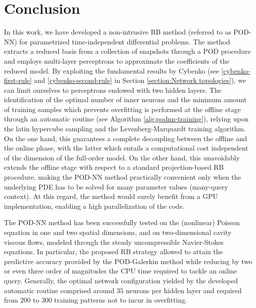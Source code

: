 \documentclass[12pt, a4paper, twoside, openright, notitlepage]{report}
\numberwithin{equation}{chapter}
\theoremstyle{theorem}
\theoremstyle{definition}
\theoremstyle{remark}
\theoremstyle{proposition}
\numberwithin{figure}{chapter}
\begin{document}
		
	\chapter*{Conclusion}
	
		In this work, we have developed a non-intrusive RB method (referred to as POD-NN) for parametrized time-independent differential problems. The method extracts a reduced basis from a collection of snapshots through a POD procedure and employs multi-layer perceptrons to approximate the coefficients of the reduced model. By exploiting the fundamental results by Cybenko (see \ref{cybenko-first-rule} and \ref{cybenko-second-rule} in Section \ref{section:Network topologies}), we can limit ourselves to perceptrons endowed with two hidden layers. The identification of the optimal number of inner neurons and the minimum amount of training samples which prevents overfitting is performed at the offline stage through an automatic routine (see Algorithm \ref{alg:podnn-training}), relying upon the latin hypercube sampling and the Levenberg-Marquardt training algorithm. On the one hand, this guarantees a complete decoupling between the offline and the online phase, with the latter which entails a computational cost independent of the dimension of the full-order model. On the other hand, this unavoidably extends the offline stage with respect to a standard projection-based RB procedure, making the POD-NN method practically convenient only when the underlying PDE has to be solved for many parameter values (many-query context). At this regard, the method would surely benefit from a GPU implementation, enabling a high parallelization of the code.
		
		The POD-NN method has been successfully tested on the (nonlinear) Poisson equation in one and two spatial dimensions, and on two-dimensional cavity viscous flows, modeled through the steady uncompressible Navier-Stokes equations. In particular, the proposed RB strategy allowed to attain the predictive accuracy provided by the POD-Galerkin method while reducing by two or even three order of magnitudes the CPU time required to tackle an online query. Generally, the optimal network configuration yielded by the developed automatic routine comprised around $35$ neurons per hidden layer and required from $200$ to $300$ training patterns not to incur in overfitting.
		
\end{document}
